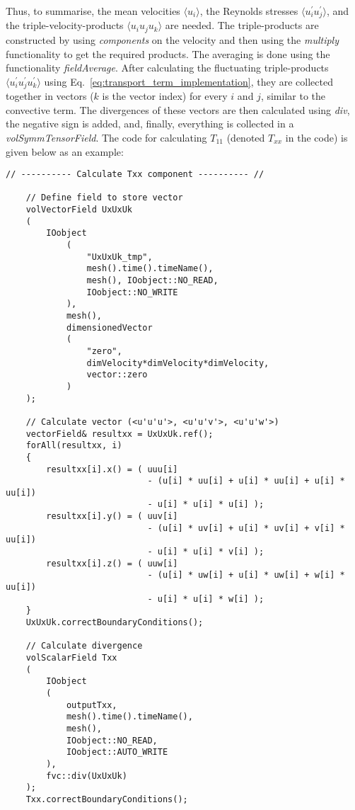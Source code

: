 Thus, to summarise, the mean velocities $\langle u_i \rangle$, the Reynolds stresses $\langle u^{\prime}_i u^{\prime}_j \rangle$, and the triple-velocity-products $\langle u_i u_j u_k \rangle$ are needed.
The triple-products are constructed by using \emph{components} on the velocity and then using the \emph{multiply} functionality to get the required products.
The averaging is done using the functionality \emph{fieldAverage}.
After calculating the fluctuating triple-products $\langle u^{\prime}_i u^{\prime}_j u^{\prime}_k \rangle$ using Eq.~\eqref{eq:transport_term_implementation}, they are collected together in vectors ($k$ is the vector index) for every $i$ and $j$, similar to the convective term.
The divergences of these vectors are then calculated using \emph{div}, the negative sign is added, and, finally, everything is collected in a \emph{volSymmTensorField}.
The \OF code for calculating $T_{11}$ (denoted $T_{xx}$ in the code) is given below as an example:

\begin{lstlisting}[emph={ddt,div,laplacian}]
    // ---------- Calculate Txx component ---------- //

    // Define field to store vector
    volVectorField UxUxUk
    (
        IOobject
            (
                "UxUxUk_tmp", 
                mesh().time().timeName(), 
                mesh(), IOobject::NO_READ, 
                IOobject::NO_WRITE
            ),
            mesh(), 
            dimensionedVector
            (
                "zero",
                dimVelocity*dimVelocity*dimVelocity,
                vector::zero
            )
    );
                                                
    // Calculate vector (<u'u'u'>, <u'u'v'>, <u'u'w'>)
    vectorField& resultxx = UxUxUk.ref();
    forAll(resultxx, i)
    {
        resultxx[i].x() = ( uuu[i] 
                            - (u[i] * uu[i] + u[i] * uu[i] + u[i] * uu[i]) 
                            - u[i] * u[i] * u[i] );
        resultxx[i].y() = ( uuv[i] 
                            - (u[i] * uv[i] + u[i] * uv[i] + v[i] * uu[i]) 
                            - u[i] * u[i] * v[i] );
        resultxx[i].z() = ( uuw[i] 
                            - (u[i] * uw[i] + u[i] * uw[i] + w[i] * uu[i]) 
                            - u[i] * u[i] * w[i] );
    }
    UxUxUk.correctBoundaryConditions();

    // Calculate divergence
    volScalarField Txx
    (
        IOobject
        (
            outputTxx, 
            mesh().time().timeName(), 
            mesh(), 
            IOobject::NO_READ, 
            IOobject::AUTO_WRITE
        ), 
        fvc::div(UxUxUk)
    );
    Txx.correctBoundaryConditions();
\end{lstlisting}

